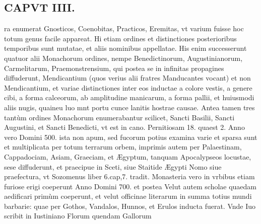 \documentclass{article}
\begin{document}
\begin{pages}
\section*{CAPVT  IIII. }
\marginpar{[ p.219 ]}\pstart ra enumerat Gnosticos, Coenobitas, Practicos, Eremitas, vt varium fuisse hoc totum genus facile appareat. Hi etiam ordines et distinctiones posterioribus temporibus sunt mutatae, et aliis nominibus appellatae. His enim successerunt quatuor alii Monachorum ordines, nempe Benedictinorum, Augustinianorum, Carmelitarum, Praemonstrensium, qui postea se in infinitas propagines diffuderunt, Mendicantium (quos verius alii fratres Manducantes vocant) et non Mendicantium, et variae distinctiones inter eos inductae a colore vestis, a genere cibi, a forma calceorum, ab amplitudine manicarum, a forma pallii, et huiusmodi aliis nugis, quaineu luo mnt portu cunce lanitis hostrae causae. Antea tamen tres tantùm ordines Monachorum enumerabantur scilicet, Sancti Basilii, Sancti Augustini, et Sancti Benedicti, vt est in cano. Pernitiosam 18. quaest 2.  \pend\pstart Anno vero Domini 500. ista non apum, sed fucorum potius examina varie et sparsa sunt et multiplicata per totum terrarum orbem, imprimis autem per Palaestinam, Cappadociam, Asiam, Graeciam, et Ægyptum, tanquam Apocalypseos locustae, sese diffuderunt, et praecipue in Sceti, siue Staitide Ægypti Nomo siue praefectura, vt Sozomenus liber 6.cap,7. tradit.  \pend\pstart Monasteria vero in vrbibus etiam furiose erigi coeperunt Anno Domini 700. et postea Velut autem scholae quaedam aedificari primùm coeperunt, et velut officinae literarum in summa totius mundi barbarie: quae per Gothos, Vandalos, Hunnos, et Erulos inducta fuerat. Vnde Iuo scribit in Iustiniano Florum quendam Gallorum  \pend

\end{pages}
\end{document}
